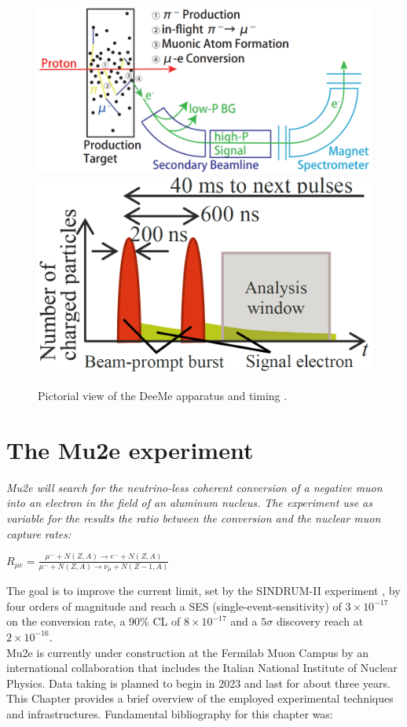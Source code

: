 \documentclass[12pt,a4paper,openright, oneside, titlepage]{book} %
\begin{document}
\begin{figure}[h!]
\centering
\includegraphics[scale=0.4]{DeeMe}
\includegraphics[scale=0.4]{DeeMe_event}
\caption[DeeMe experiment]{Pictorial view of the DeeMe apparatus and timing \cite{DeeMe}. }
\label{_DeeMe}
\end{figure}

\chapter{The Mu2e experiment}
{\itshape 
Mu2e will search for the neutrino-less coherent conversion of a negative muon into an electron in the field of an aluminum nucleus. 
The experiment use as variable for the results the ratio between the conversion and the nuclear muon capture rates:
\begin{center}
$R_{\mu e} = \frac{\mu^- + N(Z, A) \rightarrow e^- + N(Z, A)}
{\mu^- + N(Z,A) \rightarrow \nu_{\mu} + N(Z-1, A)}$
\end{center}
\noindent
The goal is to improve the current limit, set by the SINDRUM-II experiment \cite{SINDRUMII}, by four orders of magnitude and reach a SES (single-event-sensitivity) of $3\times 10^{-17}$ on the conversion rate, a 90\% CL of $8\times 10^{-17}$ and a $5\sigma$ discovery reach at $2\times 10^{-16}$.\\
Mu2e is currently under construction at the Fermilab Muon Campus by an international collaboration that includes the Italian National Institute of Nuclear Physics.
Data taking is planned to begin in 2023 and last for about three years. 
This Chapter provides a brief overview of the employed experimental techniques and infrastructures. Fundamental bibliography for this chapter was: \cite{MTDR} \cite{Signorelli} \cite{bob_cflv} \cite{bob_mu2e} \cite{Manolis}}
\end{document}
